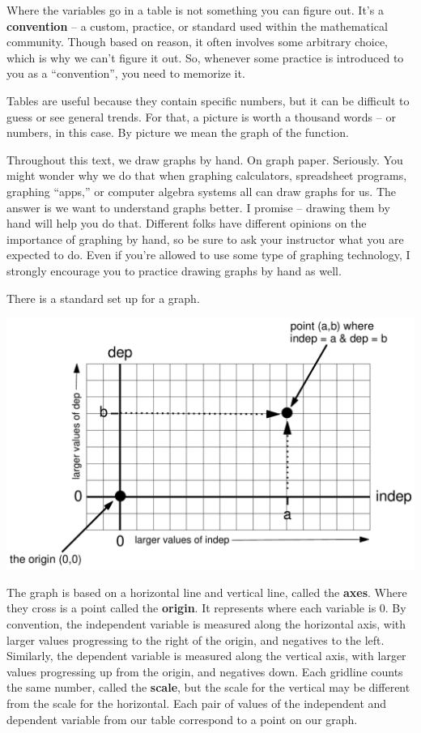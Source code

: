 Where the variables go in a table is not something you can figure out.  It's a \textbf{convention} -- a custom, practice, or standard used within the mathematical community.  Though based on reason, it often involves some arbitrary choice, which is why we can't figure it out.  So, whenever some practice is introduced to you as a ``convention'', you need to memorize it.  
 
Tables are useful because they contain specific numbers, but it can be difficult to guess or see general trends.  For that, a picture is worth a thousand words -- or numbers, in this case.   By picture we mean the graph of the function.  

Throughout this text, we draw graphs by hand.  On graph paper.  Seriously.  You might wonder why we do that  when graphing calculators, spreadsheet programs, graphing ``apps,'' or computer algebra systems all can draw graphs for us.  The answer is we want to understand graphs better.  I promise -- drawing them by hand will help you do that.  Different folks have different opinions on the importance of graphing by hand, so be sure to ask your instructor what you are expected to do.  Even if you're allowed to use some type of graphing technology, I strongly encourage you to practice drawing graphs by hand as well.

There is a standard set up for a graph.
\begin{center}
 {\includegraphics [width = 6in] {GraphLabelAxes.pdf}}
\end{center}
The graph is based on a horizontal line and vertical line, called the \textbf{axes}.  Where they cross is a point called the \textbf{origin}.  It represents where each variable is 0.  By convention, the independent variable is measured along the horizontal axis, with larger values progressing to the right of the origin, and negatives to the left.  Similarly, the dependent variable is measured along the vertical axis, with larger values progressing up from the origin, and negatives down.  Each gridline counts the same number, called the \textbf{scale}, but the scale for the vertical may be different from the scale for the horizontal.  Each pair of values of the independent and dependent variable from our table correspond to a point on our graph.  

